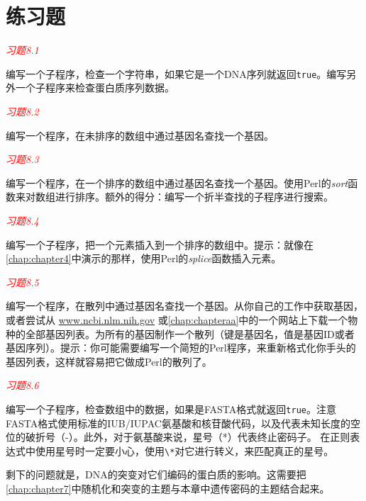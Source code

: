 \section{练习题}
\textcolor{red}{\textit{习题8.1}}
\begin{adjustwidth}{1cm}{}
编写一个子程序，检查一个字符串，如果它是一个DNA序列就返回\verb|true|。编写另外一个子程序来检查蛋白质序列数据。
\end{adjustwidth}

\textcolor{red}{\textit{习题8.2}}
\begin{adjustwidth}{2em}{}
编写一个程序，在未排序的数组中通过基因名查找一个基因。
\end{adjustwidth}

\textcolor{red}{\textit{习题8.3}}
\begin{adjustwidth}{2em}{}
编写一个程序，在一个排序的数组中通过基因名查找一个基因。使用Perl的\textit{sort}函数来对数组进行排序。额外的得分：编写一个折半查找的子程序进行搜索。
\end{adjustwidth}

\textcolor{red}{\textit{习题8.4}}
\begin{adjustwidth}{2em}{}
编写一个子程序，把一个元素插入到一个排序的数组中。提示：就像在\autoref{chap:chapter4}中演示的那样，使用Perl的\textit{splice}函数插入元素。
\end{adjustwidth}

\textcolor{red}{\textit{习题8.5}}
\begin{adjustwidth}{2em}{}
编写一个程序，在散列中通过基因名查找一个基因。从你自己的工作中获取基因，或者尝试从 \href{www.ncbi.nlm.nih.gov}{www.ncbi.nlm.nih.gov} 或\autoref{chap:chapteraa}中的一个网站上下载一个物种的全部基因列表。为所有的基因制作一个散列（键是基因名，值是基因ID或者基因序列）。提示：你可能需要编写一个简短的Perl程序，来重新格式化你手头的基因列表，这样就容易把它做成Perl的散列了。
\end{adjustwidth}

\textcolor{red}{\textit{习题8.6}}
\begin{adjustwidth}{2em}{}
编写一个子程序，检查数组中的数据，如果是FASTA格式就返回\verb|true|。注意FASTA格式使用标准的IUB/IUPAC氨基酸和核苷酸代码，以及代表未知长度的空位的破折号（-）。此外，对于氨基酸来说，星号（*）代表终止密码子。 在正则表达式中使用星号时一定要小心，使用\verb|\*|对它进行转义，来匹配真正的星号。
\end{adjustwidth}

剩下的问题就是，DNA的突变对它们编码的蛋白质的影响。这需要把\autoref{chap:chapter7}中随机化和突变的主题与本章中遗传密码的主题结合起来。

